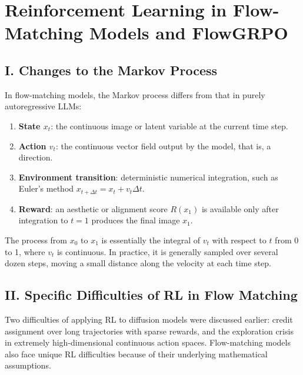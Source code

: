\setcounter{section}{2}

\hypertarget{reinforcement-learning-in-flow-matching-models-and-flowgrpo}{%
\section{Reinforcement Learning in Flow-Matching Models and FlowGRPO}\label{reinforcement-learning-in-flow-matching-models-and-flowgrpo}}

\hypertarget{i.-changes-to-the-markov-process}{%
\subsection{I. Changes to the Markov Process}\label{i.-changes-to-the-markov-process}}

In flow-matching models, the Markov process differs from that in purely autoregressive LLMs:

\begin{enumerate}
\def\labelenumi{\arabic{enumi}.}
\tightlist
\item
  \textbf{State \(x_t\)}: the continuous image or latent variable at the current time step.
\item
  \textbf{Action \(v_t\)}: the continuous vector field output by the model, that is, a direction.
\item
  \textbf{Environment transition}: deterministic numerical integration, such as Euler's method \(x_{t+\Delta t}=x_t+v_t\Delta t\).
\item
  \textbf{Reward}: an aesthetic or alignment score \(R(x_1)\) is available only after integration to \(t=1\) produces the final image \(x_1\).
\end{enumerate}

The process from \(x_0\) to \(x_1\) is essentially the integral of \(v_t\) with respect to \(t\) from 0 to 1, where \(v_t\) is continuous. In practice, it is generally sampled over several dozen steps, moving a small distance along the velocity at each time step.

\hypertarget{ii.-specific-difficulties-of-rl-in-flow-matching}{%
\subsection{II. Specific Difficulties of RL in Flow Matching}\label{ii.-specific-difficulties-of-rl-in-flow-matching}}

Two difficulties of applying RL to diffusion models were discussed earlier: credit assignment over long trajectories with sparse rewards, and the exploration crisis in extremely high-dimensional continuous action spaces. Flow-matching models also face unique RL difficulties because of their underlying mathematical assumptions.

